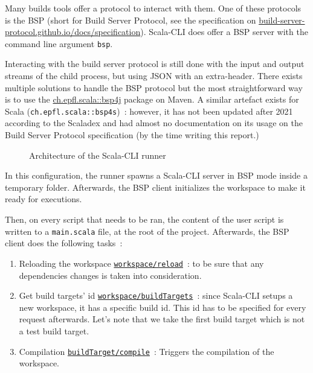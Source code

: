\documentclass{article}
\begin{document}
Many builds tools offer a protocol to interact with them. One of these protocols is the BSP (short for Build Server Protocol, see the specification on \href{https://build-server-protocol.github.io/docs/specification}{build-server-protocol.github.io/docs/specification}). Scala-CLI does offer a BSP server with the command line argument \lstinline{bsp}.

Interacting with the build server protocol is still done with the input and output streams of the child process, but using JSON with an extra-header. There exists multiple solutions to handle the BSP protocol but the most straightforward way is to use the \href{https://mvnrepository.com/artifact/ch.epfl.scala/bsp4j}{ch.epfl.scala::bsp4j} package on Maven. A similar artefact exists for Scala (\lstinline{ch.epfl.scala::bsp4s})~: however, it has not been updated after 2021 according to the Scaladex and had almost no documentation on its usage on the Build Server Protocol specification (by the time writing this report.)

\begin{figure}[H]
    \centering
    
    \caption{Architecture of the Scala-CLI runner}
\end{figure}

In this configuration, the runner spawns a Scala-CLI server in BSP mode inside a temporary folder. Afterwards, the BSP client initializes the workspace to make it ready for executions.

Then, on every script that needs to be ran, the content of the user script is written to a \lstinline{main.scala} file, at the root of the project. Afterwards, the BSP client does the following tasks~:

\begin{enumerate}
    \item Reloading the workspace \href{https://build-server-protocol.github.io/docs/specification#reload-request}{\lstinline{workspace/reload}}~: to be sure that any dependencies changes is taken into consideration.
    \item Get build targets' id \href{https://build-server-protocol.github.io/docs/specification#workspace-build-targets-request}{\lstinline{workspace/buildTargets}}~: since Scala-CLI setups a new workspace, it has a specific build id. This id has to be specified for every request afterwards. Let's note that we take the first build target which is not a test build target.
    \item Compilation \href{https://build-server-protocol.github.io/docs/specification#compile-request}{\lstinline{buildTarget/compile}}~: Triggers the compilation of the workspace.
\end{enumerate}
\end{document}

